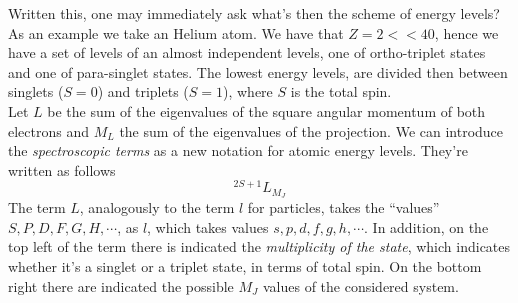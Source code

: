 \documentclass[../qm.tex]{subfiles}
\begin{document}
	Written this, one may immediately ask what's then the scheme of energy levels? As an example we take an Helium atom. We have that $Z=2<<40$, hence we have a set of levels of an almost independent levels, one of ortho-triplet states and one of para-singlet states. The lowest energy levels, are divided then between singlets ($S=0$) and triplets ($S=1$), where $S$ is the total spin.\\
	Let $L$ be the sum of the eigenvalues of the square angular momentum of both electrons and $M_L$ the sum of the eigenvalues of the projection. We can introduce the \textit{spectroscopic terms} as a new notation for atomic energy levels. They're written as follows
	\begin{equation}
		^{2S+1}L_{M_J}
		\label{eq:atomictermsymboldef}
	\end{equation}
	The term $L$, analogously to the term $l$ for particles, takes the ``values'' $S,P,D,F,G,H,\cdots$, as $l$, which takes values $s,p,d,f,g,h,\cdots$. In addition, on the top left of the term there is indicated the \textit{multiplicity of the state}, which indicates whether it's a singlet or a triplet state, in terms of total spin. On the bottom right there are indicated the possible $M_J$ values of the considered system.
\end{document}
